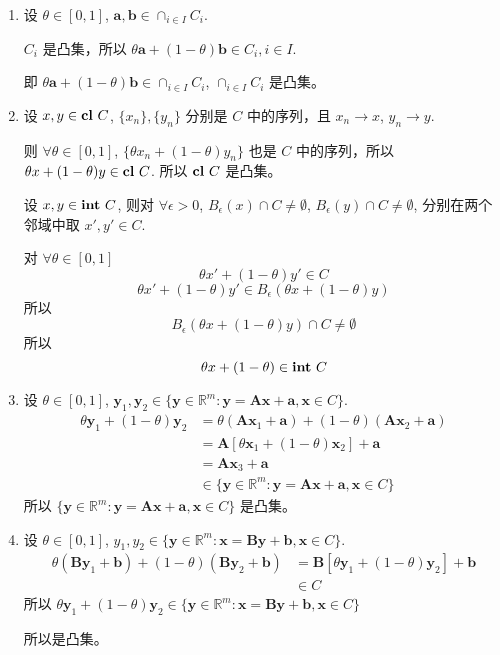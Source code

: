 \documentclass[11pt,letter,notitlepage]{article}
\theoremstyle{definition}
\DeclareMathOperator*{\intp}{\bf int\,}
\DeclareMathOperator*{\cl}{\bf cl\,}
\begin{document}
\begin{solution}
	\begin{enumerate}
		\item 设 $\theta\in[0,1]$, $\mathbf{a},\mathbf{b}\in\cap_{i\in I} C_i$.

		      $C_i$ 是凸集，所以 $\theta \mathbf{a}+(1-\theta)\mathbf{b}\in C_i, i\in I$.

		      即 $\theta \mathbf{a}+(1-\theta)\mathbf{b}\in \cap_{i\in I} C_i$, $\cap_{i\in I} C_i$ 是凸集。
		\item 设 $x,y \in \cl C$, $\{x_n\},\{y_n\}$ 分别是 $C$ 中的序列，且 $x_n\to x$, $y_n \to y$.
		
		则 $\forall \theta\in[0,1]$, $\{\theta x_n +(1-\theta)y_n\}$ 也是 $C$ 中的序列，所以 $\theta x+(1-\theta)y \in \cl C$. 所以 $\cl C$ 是凸集。

		设 $x,y \in \intp C$, 则对 $\forall \epsilon>0$, $B_\epsilon(x)\cap C\neq \emptyset$,  $B_\epsilon(y)\cap C\neq \emptyset$, 分别在两个邻域中取 $x',y'\in C$.

		对 $\forall \theta\in[0,1]$
		$$\theta x'+(1-\theta) y'\in C$$
		$$\theta x'+(1-\theta) y' \in B_\epsilon (\theta x+(1-\theta)y)$$
		所以 $$B_\epsilon (\theta x+(1-\theta)y)\cap C \neq \emptyset$$
		所以 $$\theta x+(1-\theta)\in \intp C$$
		\item 设 $\theta\in[0,1]$, $\mathbf{y}_1,\mathbf{y}_2\in \{ \mathbf{y}\in\mathbb{R}^m:\mathbf{y}=\mathbf{Ax}+\mathbf{a},\mathbf{x}\in C \}$.
		      $$\begin{aligned}
				      \theta \mathbf{y}_1+(1-\theta)\mathbf{y}_2
				       & =\theta (\mathbf{A}\mathbf{x}_1+\mathbf{a})+(1-\theta) (\mathbf{A}\mathbf{x}_2+\mathbf{a}) \\
				       & =\mathbf{A}[\theta \mathbf{x}_1+(1-\theta)\mathbf{x}_2]+\mathbf{a}                         \\
				       & =\mathbf{A}\mathbf{x}_3+\mathbf{a}                                                         \\
				       & \in \{ \mathbf{y}\in\mathbb{R}^m:\mathbf{y}=\mathbf{Ax}+\mathbf{a},\mathbf{x}\in C \}
			      \end{aligned}$$
		      所以 $\{ \mathbf{y}\in\mathbb{R}^m:\mathbf{y}=\mathbf{Ax}+\mathbf{a},\mathbf{x}\in C \}$ 是凸集。
		\item 设 $\theta\in[0,1]$, $y_1,y_2\in \{ \mathbf{y}\in\mathbb{R}^m:\mathbf{x}=\mathbf{By}+\mathbf{b},\mathbf{x}\in C \}$.
		      $$\begin{aligned}
				      \theta (\mathbf{B}\mathbf{y}_1+\mathbf{b})+(1-\theta) (\mathbf{B}\mathbf{y}_2+\mathbf{b})
				       & =\mathbf{B}[\theta \mathbf{y}_1+(1-\theta) \mathbf{y}_2]+\mathbf{b} \\
				       & \in C
			      \end{aligned}$$
		      所以 $\theta \mathbf{y}_1+(1-\theta) \mathbf{y}_2\in\{ \mathbf{y}\in\mathbb{R}^m:\mathbf{x}=\mathbf{By}+\mathbf{b},\mathbf{x}\in C \}$

		      所以是凸集。
	\end{enumerate}
\end{solution}
\end{document}
